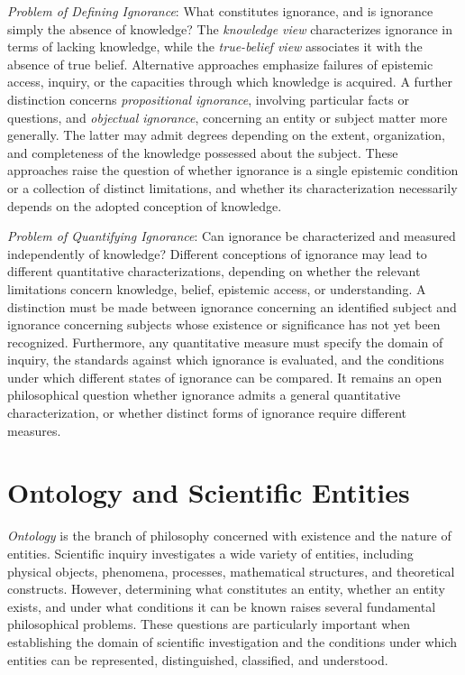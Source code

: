 \emph{Problem of Defining Ignorance}: What constitutes ignorance, and is ignorance simply the absence of knowledge? The \emph{knowledge view} characterizes ignorance in terms of lacking knowledge, while the \emph{true-belief view} associates it with the absence of true belief. Alternative approaches emphasize failures of epistemic access, inquiry, or the capacities through which knowledge is acquired. A further distinction concerns \emph{propositional ignorance}, involving particular facts or questions, and \emph{objectual ignorance}, concerning an entity or subject matter more generally. The latter may admit degrees depending on the extent, organization, and completeness of the knowledge possessed about the subject. These approaches raise the question of whether ignorance is a single epistemic condition or a collection of distinct limitations, and whether its characterization necessarily depends on the adopted conception of knowledge.

\emph{Problem of Quantifying Ignorance}: Can ignorance be characterized and measured independently of knowledge? Different conceptions of ignorance may lead to different quantitative characterizations, depending on whether the relevant limitations concern knowledge, belief, epistemic access, or understanding. A distinction must be made between ignorance concerning an identified subject and ignorance concerning subjects whose existence or significance has not yet been recognized. Furthermore, any quantitative measure must specify the domain of inquiry, the standards against which ignorance is evaluated, and the conditions under which different states of ignorance can be compared. It remains an open philosophical question whether ignorance admits a general quantitative characterization, or whether distinct forms of ignorance require different measures.

%
%

\section{Ontology and Scientific Entities}
\label{sec:what-is-an-entity}

\emph{Ontology} is the branch of philosophy concerned with existence and the nature of entities. Scientific inquiry investigates a wide variety of entities, including physical objects, phenomena, processes, mathematical structures, and theoretical constructs. However, determining what constitutes an entity, whether an entity exists, and under what conditions it can be known raises several fundamental philosophical problems. These questions are particularly important when establishing the domain of scientific investigation and the conditions under which entities can be represented, distinguished, classified, and understood.


